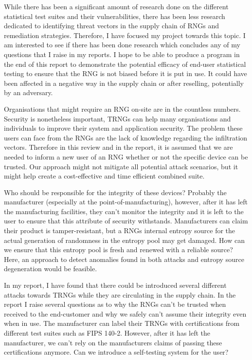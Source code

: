 \documentclass[]{final_report}
\begin{document}
\par{While there has been a significant amount of research done on the different statistical test suites and their vulnerabilities, there has been less research dedicated to identifying threat vectors in the supply chain of RNGs and remediation strategies. Therefore, I have focused my project towards this topic. I am interested to see if there has been done research which concludes any of my questions that I raise in my reports. I hope to be able to produce a program in the end of this report to demonstrate the potential efficacy of end-user statistical testing to ensure that the RNG is not biased before it is put in use. It could have been affected in a negative way in the supply chain or after reselling, potentially by an adversary.}

\par{Organisations that might require an RNG on-site are in the countless numbers. Security is nonetheless important, TRNGs can help many organisations and individuals to improve their system and application security. The problem these users can face from the RNGs are the lack of knowledge regarding the infiltration vectors. Therefore in this review and in the report, it is assumed that we are needed to inform a new user of an RNG whether or not the specific device can be trusted. Our approach might not mitigate all potential attack scenarios, but it might help create a cost-effective and time efficient combined suite.}

\par{Who should be responsible for the integrity of these devices? Probably the manufacturer (especially at the point-of-manufacturing), however, after it has left the manufacturing facilities, they can't monitor the integrity and it is left to the user to ensure that this attribute of security withstands. Manufacturers can claim their product is tamper-resistant, but a RNGs internal entropy source for the actual generation of randomness in the entropy pool may get damaged. How can we ensure that this entropy pool is fresh and renewed with a reliable source? Here, an approach to detect anomalies found in both attacks and entropy source degeneration would be feasible.} 

\par{In my  report, I have found that there could be introduced several different attacks towards TRNGs while they are circulating in the supply chain. In the report I raise several questions as to why the RNGs can't be trusted when received to the end-customer and why we safely can't assume their integrity even when in use. The manufacturer can label their TRNGs with certifications from different test suites such as FIPS 140-2. However, after it has left the manufacturer, we can't rely on the manufacturers claims of passing these certifications anymore. Can we introduce a self-testing system for the user?}
\end{document}
